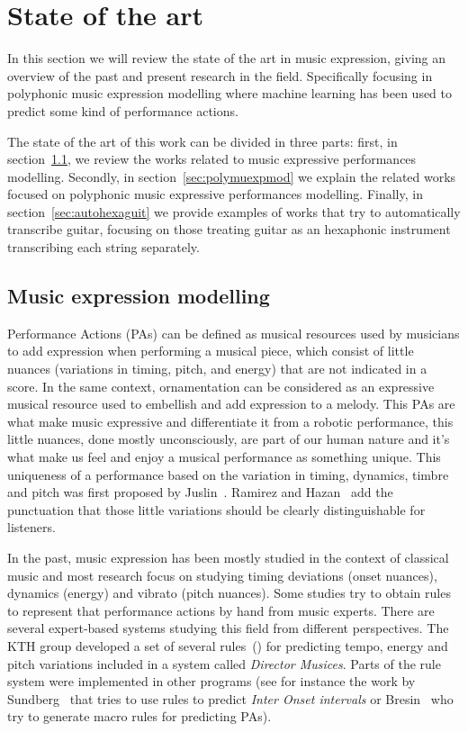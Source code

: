 \normallinespacing
\chapter{State of the art}
\label{chap:sota}
In this section we will review the state of the art in music expression, giving an
overview of the past and present research in the field. Specifically focusing in polyphonic music expression modelling where machine learning has been used to predict some kind of performance actions.

The state of the art of this work can be divided in three parts: first, in section~\ref{sec:muexpmod}, we review the works related to music expressive performances modelling. Secondly, in section~\ref{sec:polymuexpmod} we explain the related works focused on polyphonic music expressive performances modelling. Finally, in section~\ref{sec:autohexaguit} we provide examples of works that try to automatically transcribe guitar, focusing on those treating guitar as an hexaphonic instrument transcribing each string separately. 

\section{Music expression modelling}
\label{sec:muexpmod}

Performance Actions (PAs) can be defined as musical resources used by musicians to add expression when performing a musical piece, which consist of little nuances (variations in timing, pitch, and energy) that are not indicated in a score. In the same context, ornamentation can be considered as an expressive musical resource used to embellish and add expression to a melody. This PAs are what make music expressive and differentiate it from a robotic performance, this little nuances, done mostly unconsciously, are part of our human nature and it's what make us feel and enjoy a musical performance as something unique. This uniqueness of a performance based on the variation in timing, dynamics, timbre and pitch was first proposed by Juslin~\cite{Juslin2001}. Ramirez and Hazan~\cite{Ramirez2006} add the punctuation that those little variations should be clearly distinguishable for listeners.

In the past, music expression has been mostly studied in the context of classical music and most research focus on studying timing deviations (onset nuances), dynamics (energy) and vibrato (pitch nuances). Some studies try to obtain rules to represent that performance actions by hand from music experts. There are several expert-based systems studying this field from different perspectives. The KTH group developed a set of several rules~(\cite{Friberg2009}) for predicting tempo, energy and pitch variations included in a system called \textit{Director Musices}. Parts of the rule system were implemented in other programs (see for instance the work by Sundberg~\cite{Sundberg2003} that tries to use rules to predict \textit{Inter Onset intervals} or Bresin~\cite{Bresin2000} who try to generate macro rules for predicting PAs).


